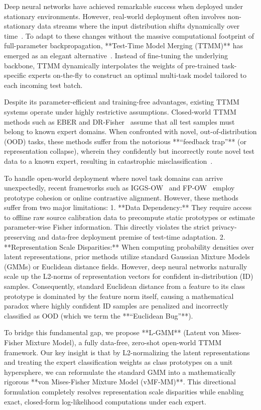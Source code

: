 \documentclass{article}
\theoremstyle{plain}
\theoremstyle{definition}
\theoremstyle{remark}
\begin{document}
Deep neural networks have achieved remarkable success when deployed under stationary environments. However, real-world deployment often involves non-stationary data streams where the input distribution shifts dynamically over time~\cite{wang21, zhang22}. To adapt to these changes without the massive computational footprint of full-parameter backpropagation, **Test-Time Model Merging (TTMM)** has emerged as an elegant alternative~\cite{yang24, hubotter25}. Instead of fine-tuning the underlying backbone, TTMM dynamically interpolates the weights of pre-trained task-specific experts on-the-fly to construct an optimal multi-task model tailored to each incoming test batch.

Despite its parameter-efficient and training-free advantages, existing TTMM systems operate under highly restrictive assumptions. Closed-world TTMM methods such as EBER and DR-Fisher~\cite{zhao24} assume that all test samples must belong to known expert domains. When confronted with novel, out-of-distribution (OOD) tasks, these methods suffer from the notorious **``feedback trap''** (or representation collapse), wherein they confidently but incorrectly route novel test data to a known expert, resulting in catastrophic misclassification~\cite{hubotter25}.

To handle open-world deployment where novel task domains can arrive unexpectedly, recent frameworks such as IGGS-OW~\cite{hubotter25} and FP-OW~\cite{luan26} employ prototype cohesion or online contrastive alignment. However, these methods suffer from two major limitations:
1. **Data Dependency:** They require access to offline raw source calibration data to precompute static prototypes or estimate parameter-wise Fisher information. This directly violates the strict privacy-preserving and data-free deployment premise of test-time adaptation.
2. **Representation Scale Disparities:** When computing probability densities over latent representations, prior methods utilize standard Gaussian Mixture Models (GMMs) or Euclidean distance fields. However, deep neural networks naturally scale up the L2-norms of representation vectors for confident in-distribution (ID) samples. Consequently, standard Euclidean distance from a feature to its class prototype is dominated by the feature norm itself, causing a mathematical paradox where highly confident ID samples are penalized and incorrectly classified as OOD (which we term the **``Euclidean Bug''**).

To bridge this fundamental gap, we propose **L-GMM** (Latent von Mises-Fisher Mixture Model), a fully data-free, zero-shot open-world TTMM framework. Our key insight is that by L2-normalizing the latent representations and treating the expert classification weights as class prototypes on a unit hypersphere, we can reformulate the standard GMM into a mathematically rigorous **von Mises-Fisher Mixture Model (vMF-MM)**. This directional formulation completely resolves representation scale disparities while enabling exact, closed-form log-likelihood computations under each expert.
\end{document}

